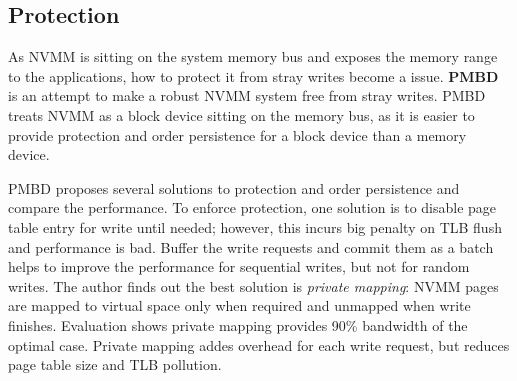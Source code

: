 

\subsection{Protection} 
\label{sec:protection}

As NVMM is sitting on the system memory bus and exposes the memory range
to the applications, how to protect it from stray writes become a issue.
\textbf{PMBD}~\cite{PMBD}
is an attempt to make a robust NVMM system free from stray writes.
PMBD treats NVMM as a block device sitting on the memory bus, as it is
easier to provide protection and order persistence for
a block device than a memory device.

PMBD proposes several solutions to protection and order persistence and
compare the performance. To enforce protection, one solution is to disable page
table entry for write until needed; however, this incurs big penalty on
TLB flush and performance is bad. Buffer the write requests and commit
them as a batch helps to improve the performance for sequential writes,
but not for random writes. The author finds out the best solution is 
\emph{private mapping}: NVMM pages are mapped to virtual space only when
required and unmapped when write finishes. Evaluation shows private
mapping provides 90\% bandwidth of the optimal case. Private mapping
addes overhead for each write request, but reduces page table size and
TLB pollution.

